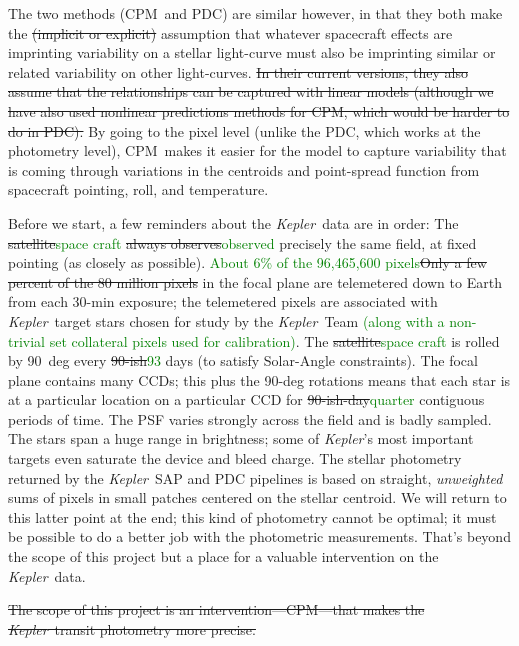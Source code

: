 \documentclass[12pt, preprint]{aastex}
\newcommand{\project}[1]{\textsl{#1}}
\newcommand{\Kepler}{\project{Kepler}}
\newcommand{\name}{CPM}
\newcommand{\revise}[1]{\textcolor{green}{#1}}
\newcommand{\remove}[1]{\sout{#1}}
\begin{document}
The two methods (\name\ and PDC) are similar however,
  in that they both make the \remove{(implicit or explicit)} assumption that whatever spacecraft effects are imprinting variability on a stellar light-curve
  must also be imprinting similar or related variability on other light-curves.
\remove{In their current versions, they also assume that the relationships can be captured with linear models (although we have also used nonlinear predictions methods for \name, which would be harder to do in PDC).}
By going to the pixel level (unlike the PDC, which works at the photometry level),
  \name\ makes it easier for the model to capture variability
  that is coming through variations in the centroids and point-spread function
  from spacecraft pointing, roll, and temperature.

Before we start, a few reminders about the \Kepler\ data are in order:
The \remove{satellite}\revise{space craft} \remove{always observes}\revise{observed} precisely the same field, at fixed pointing (as closely as possible).
\revise{About 6\% of the 96,465,600 pixels}\remove{Only a few percent of the 80 million pixels} in the focal plane are telemetered down
  to Earth from each 30-min exposure;
  the telemetered pixels are associated with \Kepler\ target stars chosen for study by the \Kepler\ Team \revise{(along with a non-trivial set collateral pixels used for calibration)}.
The \remove{satellite}\revise{space craft} is rolled by 90~deg every \remove{90-ish}\revise{93} days (to satisfy Solar-Angle constraints).
The focal plane contains many CCDs;
  this plus the 90-deg rotations means that each star is at a particular location
  on a particular CCD for \remove{90-ish-day}\revise{quarter} contiguous periods of time.
The PSF varies strongly across the field and is badly sampled.
The stars span a huge range in brightness;
  some of \Kepler's most important targets even saturate the device and bleed charge.
The stellar photometry returned by the \Kepler\ SAP and PDC pipelines is based on
  straight, \emph{unweighted} sums of pixels in small patches centered on the stellar centroid.
We will return to this latter point at the end;
  this kind of photometry cannot be optimal;
  it must be possible to do a better job with the photometric measurements.
That's beyond the scope of this project but a place for a valuable intervention on the \Kepler\ data.

\remove{The scope of this project is an intervention---\name---that makes the \Kepler\ transit photometry more precise.}
\end{document}
